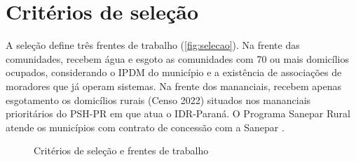 \section{Critérios de seleção}
\label{sec:criterios}

A seleção define três frentes de trabalho (\autoref{fig:selecao}). Na frente
das comunidades, recebem água e esgoto as comunidades com 70 ou mais domicílios
ocupados, considerando o IPDM do município \cite{ipdm} e a existência de
associações de moradores que já operam sistemas. Na frente dos mananciais,
recebem apenas esgotamento os domicílios rurais (Censo 2022) situados nos
mananciais prioritários do PSH-PR em que atua o IDR-Paraná. O Programa Sanepar
Rural atende os municípios com contrato de concessão com a Sanepar
\cite{mop2026}.

\begin{figure}[htbp]
  \centering
  \caption{Critérios de seleção e frentes de trabalho}
  \label{fig:selecao}
\end{figure}

